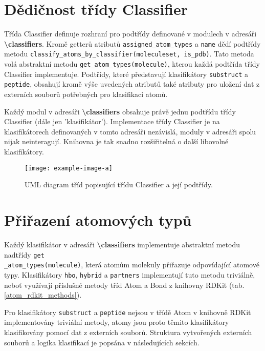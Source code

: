 \section{Dědičnost třídy Classifier}
Třída Classifier definuje rozhraní pro podtřídy definované v modulech v adresáři \textbf{\textbackslash classifiers}. %
Kromě getterů atribu\-tů \verb|assigned_atom_types| a \verb|name| dědí podtřídy metodu \verb|classify_atoms_by_classifier(moleculeset, is_pdb)|. Ta\-to metoda volá abstra\-ktní metodu \verb|get_atom_types(molecule)|, kterou každá podtřída třídy Classifier implementuje. Podtřídy, které představují klasifikátory \verb|substruct| a \verb|peptide|, obsahují kromě výše uvedených atributů také atributy pro uložení dat z externích souborů potřebných pro klasifikaci atomů.

Každý modul v adresáři \textbf{\textbackslash classifiers} obsahuje právě jednu podtřídu třídy Classifier (dále jen 'klasifikátor'). Implementace třídy Classifier je na klasifikátorech definovaných v tomto adresáři nezávislá, moduly v adresáři spolu nijak neinteragují. Knihovna je tak snadno rozšiřitelná o další libovolné klasifikátory. 

\bigskip
\begin{figure}[h]
    \centering
    \texttt{[image: example-image-a]}
    \caption{UML diagram tříd popisující třídu Classifier a její podtřídy.}
    \label{classes_UML}
\end{figure}

    
\section{Přiřazení atomových typů}
Každý klasifikátor v adresáři \textbf{\textbackslash classifiers} implementuje abstraktní metodu nadtřídy \verb|get|\\ \verb|_atom_types(molecule)|, která atomům molekuly přiřazuje odpovídající atomové ty\-py. Klasifikátory \verb|hbo|, \verb|hybrid| a \verb|partners| implementují tuto metodu triviálně, neboť využívají příslušné metody tříd Atom a Bond z knihovny RDKit (tab.  \ref{atom_rdkit_methods}). 

Pro klasifikátory \verb|substruct| a \verb|peptide| nejsou v třídě Atom v knihovně RDKit implementovány triviální metody, atomy jsou proto těmito klasifikátory klasifikovány pomocí dat z externích souborů. Struktura vytvořených externích souborů a logika  klasifikací je popsána v následujících sekcích. 

